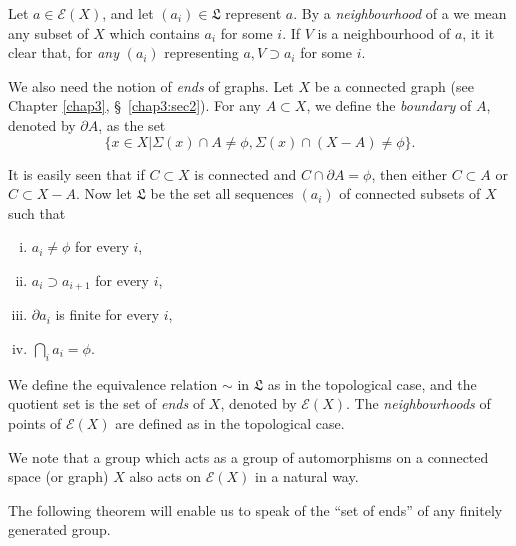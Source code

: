     Let $a \in  \mathscr{E}(X)$, and let $(a_i) \in \mathfrak{L}$
    represent $a$. By  a \textit{neighbourhood} of a we mean any
    subset of $X$ which contains $a_i$ for some $i$. If $V$  is a
    neighbourhood of $a$, it it clear that, for  \textit{any} $(a_i)$
    representing $a, V \supset a_i$ for some $i$. 
    
    We also need the notion of \textit{ends} of graphs. Let $X$ be a
    connected graph (see Chapter \ref{chap3}, \S\
    \ref{chap3:sec2}). For any $A \subset X$, we define the
    \textit{boundary} of $A$, denoted by $\partial A$, as the set  
    $$
    \bigg\{ x \in  X \big| \Sigma (x) \cap A \neq \phi, \Sigma (x)
    \cap (X-A) \neq \phi \bigg\}. 
    $$   
    
    It is easily seen that if $C \subset X$  is connected and $C \cap
    \partial A= \phi$, then either $C \subset A$ or $C \subset X-A$. Now let
    $\mathfrak{L}$ be the set all sequences $(a_i)$ of connected
    subsets of $X$ such that  
    \begin{enumerate}[(i)]
    \item $a_i \neq \phi$ for every $i$, 
    \item $a_i \supset a_{i+1}$ for every $i$, 
    \item $\partial a_i$ is finite for every $i$, 
    \item $\bigcap\limits_{i} a_i = \phi$.
    \end{enumerate}   
    
    We define the equivalence relation $\sim$ in $\mathfrak{L}$ as in
    the topological case, and the quotient set is the set of
    \textit{ends} of $X$, denoted by  $\mathscr{E}(X)$. The
    \textit{neighbourhoods} of points of $\mathscr{E}(X)$ are defined
    as in the topological case. 
    
    We note that a group which acts as a group of automorphisms on a
    connected space (or graph) $X$ also acts on $\mathscr{E}(X)$ in a
    natural way. 
    
    The following theorem will enable us to speak of the ``set of
    ends'' of any finitely generated group. 

